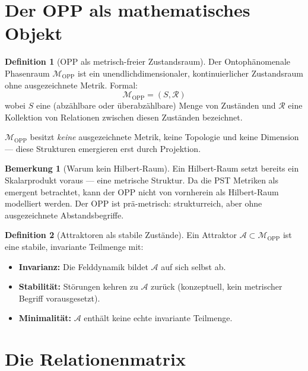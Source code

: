 \documentclass[11pt,a4paper]{article}
\theoremstyle{plain}
\theoremstyle{definition}
\newtheorem{definition}{Definition}[section]
\newtheorem{remark}{Bemerkung}[section]
\newcommand{\OPP}{\mathcal{M}_{\mathrm{OPP}}}
\begin{document}
\section{Der OPP als mathematisches Objekt}

\begin{definition}[OPP als metrisch-freier Zustandsraum]
Der Ontoph\"{a}nomenale Phasenraum $\OPP$ ist ein unendlichdimensionaler,
kontinuierlicher Zustandsraum ohne ausgezeichnete Metrik. Formal:
\[
  \OPP = (S, \mathcal{R})
\]
wobei $S$ eine (abz\"{a}hlbare oder \"{u}berabz\"{a}hlbare) Menge von
Zust\"{a}nden und $\mathcal{R}$ eine Kollektion von Relationen zwischen
diesen Zust\"{a}nden bezeichnet.

$\OPP$ besitzt \emph{keine} ausgezeichnete Metrik, keine Topologie und
keine Dimension --- diese Strukturen emergieren erst durch Projektion.
\end{definition}

\begin{remark}[Warum kein Hilbert-Raum]
Ein Hilbert-Raum setzt bereits ein Skalarprodukt voraus --- eine metrische
Struktur. Da die PST Metriken als emergent betrachtet, kann der OPP nicht
von vornherein als Hilbert-Raum modelliert werden. Der OPP ist
pr\"{a}-metrisch: strukturreich, aber ohne ausgezeichnete Abstands\-begriffe.
\end{remark}

\begin{definition}[Attraktoren als stabile Zust\"{a}nde]
Ein Attraktor $\mathcal{A} \subset \OPP$ ist eine stabile, invariante
Teilmenge mit:
\begin{itemize}
  \item \textbf{Invarianz:} Die Felddynamik bildet $\mathcal{A}$ auf
        sich selbst ab.
  \item \textbf{Stabilit\"{a}t:} St\"{o}rungen kehren zu $\mathcal{A}$
        zur\"{u}ck (konzeptuell, kein metrischer Begriff vorausgesetzt).
  \item \textbf{Minimalit\"{a}t:} $\mathcal{A}$ enth\"{a}lt keine echte
        invariante Teilmenge.
\end{itemize}
\end{definition}

\section{Die Relationenmatrix}
\end{document}
